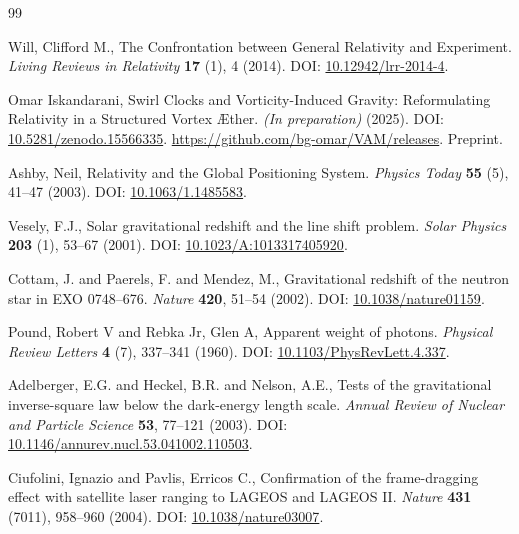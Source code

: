 \documentclass[a4paper, aps,preprint,superscriptaddress, 12pt]{revtex4}
\begin{document}
\begin{thebibliography}{99}

Will, Clifford M.,
\newblock The Confrontation between General Relativity and Experiment.
\textit{Living Reviews in Relativity} \textbf{17} (1), 4 (2014).
\newblock DOI: \href{https://doi.org/10.12942/lrr-2014-4}{10.12942/lrr-2014-4}.


Omar Iskandarani,
\newblock Swirl Clocks and Vorticity-Induced Gravity: Reformulating Relativity in a Structured Vortex Æther.
\textit{(In preparation)} (2025).
\newblock DOI: \href{https://doi.org/10.5281/zenodo.15566335}{10.5281/zenodo.15566335}.
\newblock \url{https://github.com/bg-omar/VAM/releases}.
\newblock Preprint.


Ashby, Neil,
\newblock Relativity and the Global Positioning System.
\textit{Physics Today} \textbf{55} (5), 41--47 (2003).
\newblock DOI: \href{https://doi.org/10.1063/1.1485583}{10.1063/1.1485583}.


Vesely, F.J.,
\newblock Solar gravitational redshift and the line shift problem.
\textit{Solar Physics} \textbf{203} (1), 53--67 (2001).
\newblock DOI: \href{https://doi.org/10.1023/A:1013317405920}{10.1023/A:1013317405920}.


Cottam, J. and Paerels, F. and Mendez, M.,
\newblock Gravitational redshift of the neutron star in EXO 0748--676.
\textit{Nature} \textbf{420}, 51--54 (2002).
\newblock DOI: \href{https://doi.org/10.1038/nature01159}{10.1038/nature01159}.


Pound, Robert V and Rebka Jr, Glen A,
\newblock Apparent weight of photons.
\textit{Physical Review Letters} \textbf{4} (7), 337--341 (1960).
\newblock DOI: \href{https://doi.org/10.1103/PhysRevLett.4.337}{10.1103/PhysRevLett.4.337}.


Adelberger, E.G. and Heckel, B.R. and Nelson, A.E.,
\newblock Tests of the gravitational inverse-square law below the dark-energy length scale.
\textit{Annual Review of Nuclear and Particle Science} \textbf{53}, 77--121 (2003).
\newblock DOI: \href{https://doi.org/10.1146/annurev.nucl.53.041002.110503}{10.1146/annurev.nucl.53.041002.110503}.


Ciufolini, Ignazio and Pavlis, Erricos C.,
\newblock Confirmation of the frame-dragging effect with satellite laser ranging to LAGEOS and LAGEOS II.
\textit{Nature} \textbf{431} (7011), 958--960 (2004).
\newblock DOI: \href{https://doi.org/10.1038/nature03007}{10.1038/nature03007}.



\end{thebibliography}
\end{document}
